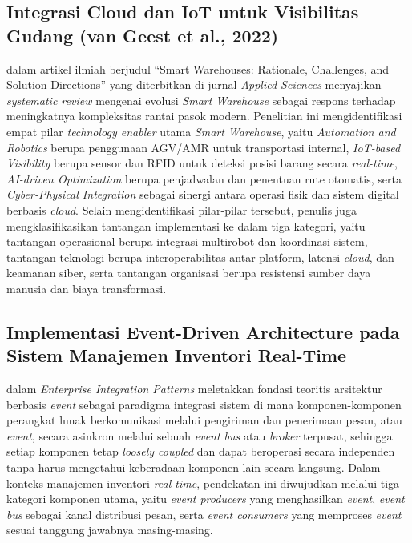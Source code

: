 \subsection{Integrasi Cloud dan IoT untuk Visibilitas Gudang (van Geest et al., 2022)}

\textcite{vangeest2021} dalam artikel ilmiah berjudul ``Smart Warehouses: Rationale, Challenges, and Solution Directions'' yang diterbitkan di jurnal \textit{Applied Sciences} menyajikan \textit{systematic review} mengenai evolusi \textit{Smart Warehouse} sebagai respons terhadap meningkatnya kompleksitas rantai pasok modern. Penelitian ini mengidentifikasi empat pilar \textit{technology enabler} utama \textit{Smart Warehouse}, yaitu \textit{Automation and Robotics} berupa penggunaan AGV/AMR untuk transportasi internal, \textit{IoT-based Visibility} berupa sensor dan RFID untuk deteksi posisi barang secara \textit{real-time}, \textit{AI-driven Optimization} berupa penjadwalan dan penentuan rute otomatis, serta \textit{Cyber-Physical Integration} sebagai sinergi antara operasi fisik dan sistem digital berbasis \textit{cloud}. Selain mengidentifikasi pilar-pilar tersebut, penulis juga mengklasifikasikan tantangan implementasi ke dalam tiga kategori, yaitu tantangan operasional berupa integrasi multirobot dan koordinasi sistem, tantangan teknologi berupa interoperabilitas antar platform, latensi \textit{cloud}, dan keamanan siber, serta tantangan organisasi berupa resistensi sumber daya manusia dan biaya transformasi.

\subsection{Implementasi Event-Driven Architecture pada Sistem Manajemen Inventori Real-Time}

\textcite{hohpe2003} dalam \textit{Enterprise Integration Patterns} meletakkan fondasi teoritis arsitektur berbasis \textit{event} sebagai paradigma integrasi sistem di mana komponen-komponen perangkat lunak berkomunikasi melalui pengiriman dan penerimaan pesan, atau \textit{event}, secara asinkron melalui sebuah \textit{event bus} atau \textit{broker} terpusat, sehingga setiap komponen tetap \textit{loosely coupled} dan dapat beroperasi secara independen tanpa harus mengetahui keberadaan komponen lain secara langsung. Dalam konteks manajemen inventori \textit{real-time}, pendekatan ini diwujudkan melalui tiga kategori komponen utama, yaitu \textit{event producers} yang menghasilkan \textit{event}, \textit{event bus} sebagai kanal distribusi pesan, serta \textit{event consumers} yang memproses \textit{event} sesuai tanggung jawabnya masing-masing.

